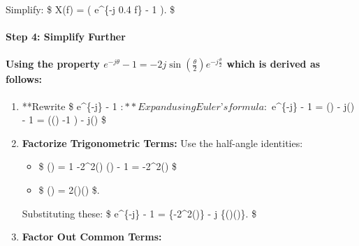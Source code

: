 \documentclass[11pt]{article}
\providecommand{\tightlist}{%
      \setlength{\itemsep}{0pt}\setlength{\parskip}{0pt}}
\begin{document}
Simplify: \$ X(f) =  \left( e\^{}\{-j 0.4 \pi f\} -
1 \right). \$

\paragraph{Step 4: Simplify Further}\label{step-4-simplify-further}

\paragraph{\texorpdfstring{\textbf{Using the property
\(e^{-j\theta} - 1 = -2j \sin\left(\frac{\theta}{2}\right) e^{-j\frac{\theta}{2}}\)}
which is derived as
follows:}{Using the property e\^{}\{-j\textbackslash theta\} - 1 = -2j \textbackslash sin\textbackslash left(\textbackslash frac\{\textbackslash theta\}\{2\}\textbackslash right) e\^{}\{-j\textbackslash frac\{\textbackslash theta\}\{2\}\} which is derived as follows:}}\label{using-the-property-e-jtheta---1--2j-sinleftfractheta2right-e-jfractheta2-which-is-derived-as-follows}

\begin{enumerate}
\def\labelenumi{\arabic{enumi}.}
\item
  **Rewrite \$ e\^{}\{-j\theta\} - 1 \(:**
  Expand using Euler’s formula:\) e\^{}\{-j\theta\} - 1 = \cos(\theta) -
  j\sin(\theta) - 1 = (\cos(\theta) -1 ) - j\sin(\theta) \$
\item
  \textbf{Factorize Trigonometric Terms:} Use the half-angle identities:

  \begin{itemize}
  \tightlist
  \item
    \$ \cos(\theta) = 1 -2\sin\^{}2\left(\right)
    \implies  \cos(\theta) - 1 =
    \color{orange}-2\sin\^{}2\left(\right) \$
  \item
    \$ \sin(\theta) =
    \color{cyan}2\sin\left(\right)\cos\left(\right)
    \$.
  \end{itemize}

  Substituting these: \$ e\^{}\{-j\theta\} - 1 =
  \{\color{orange}-2\sin\^{}2\left(\right)\} - j
  \{\color{cyan}\sin\left(\right)\cos\left(\right)\}.
  \$
\item
  \textbf{Factor Out Common Terms:}
\end{enumerate}
\end{document}
